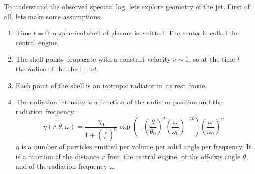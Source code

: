 \documentclass{article}
\begin{document}
To understand the observed spectral lag, lets explore geometry of the jet. First of all, lets make some assumptions:
\begin{enumerate}
\item{Time $t = 0$, a spherical shell of plasma is emitted. The center is called the central engine.}
\item{The shell points propagate with a constant velocity $v \sim 1$, so at the time $t$ the radius of the shall is $v t$.}
\item{Each point of the shell is an isotropic radiator in its rest frame.}
\item{
	The radiation intensity is a function of the radiator position and the radiation frequency:
	\begin{equation}
		\eta\left(r,\theta,\omega\right) = 
		\frac{\eta_0}{1 + \left(\frac{r}{r_0}\right)^n}
		\exp\left(
			-\left(\frac{\theta}{\theta_0}\right)^2
			\left(\frac{\omega}{\omega_0}\right)^{-2k}
		\right)
		\left(\frac{\omega}{\omega_0}\right)^\alpha
	\end{equation}
	$\eta$ is a number of particles emitted per volume per solid angle per frequency. It is a function of the distance $r$ from the central engine, of the off-axis angle $\theta$, and of the radiation frequency $\omega$.
}
\end{enumerate}
\end{document}
